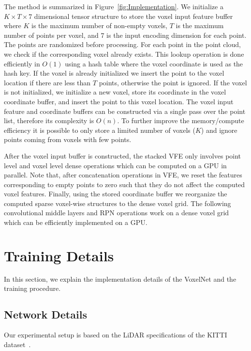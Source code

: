 \documentclass[10pt,twocolumn,letterpaper]{article}
\begin{document}
The method is summarized in Figure~\ref{fig:Implementation}. We initialize a $K \times T \times 7$ dimensional tensor structure to store the voxel input feature buffer where $K$ is the maximum number of non-empty voxels, $T$ is the maximum number of points per voxel, and $7$ is the input encoding dimension for each point. The points are randomized before processing. For each point in the point cloud, we check if the corresponding voxel already exists. This lookup operation is done efficiently in $O(1)$ using a hash table where the voxel coordinate is used as the hash key. If the voxel is already initialized we insert the point to the voxel location if there are less than $T$ points, otherwise the point is ignored. If the voxel is not initialized, we initialize a new voxel, store its coordinate in the voxel coordinate buffer, and insert the point to this voxel location. The voxel input feature and coordinate buffers can be constructed via a single pass over the point list, therefore its complexity is $O(n)$.  To further improve the memory/compute efficiency it is possible to only store a limited number of voxels ($K$) and ignore points coming from voxels with few points. 


After the voxel input buffer is constructed, the stacked VFE only involves point level and voxel level dense operations which can be computed on a GPU in parallel. Note that,  after concatenation operations in VFE, we reset the features corresponding to empty points to zero such that they do not affect  the computed voxel features. Finally, using the stored coordinate buffer we reorganize the computed sparse voxel-wise structures to the dense voxel grid. The following  convolutional middle layers and RPN operations work on a dense voxel grid which can be efficiently implemented on a GPU.













 
\section{Training Details}
\label{sec:training_details}
In this section, we explain the implementation details of the VoxelNet and the training procedure. 
\subsection{Network Details} 
Our experimental setup is based on the LiDAR specifications of the KITTI dataset~\cite{REF:Geiger2012CVPR}.
\end{document}
